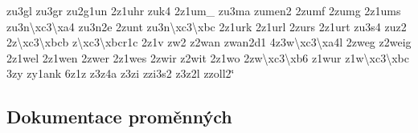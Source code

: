 \begin{DoxyCompactItemize}
zu3gl zu3gr zu2g1un 2z1uhr zuk4 2z1um\-\_\- zu3ma zumen2 2zumf 2zumg 2z1ums zu3n\textbackslash{}xc3\textbackslash{}xa4 zu3n2e 2zunt zu3n\textbackslash{}xc3\textbackslash{}xbc 2z1urk 2z1url 2zurs 2z1urt zu3s4 zuz2 2z\textbackslash{}xc3\textbackslash{}xbcb z\textbackslash{}xc3\textbackslash{}xbcr1c 2z1v zw2 z2wan zwan2d1 4z3w\textbackslash{}xc3\textbackslash{}xa4l 2zweg z2weig 2z1wel 2z1wen 2zwer 2z1wes 2zwir z2wit 2z1wo 2zw\textbackslash{}xc3\textbackslash{}xb6 z1wur z1w\textbackslash{}xc3\textbackslash{}xbc 3zy zy1ank 6z1z z3z4a z3zi zzi3s2 z3z2l zzoll2\char`\"{}
\end{DoxyCompactItemize}


\subsection{Dokumentace proměnných}
